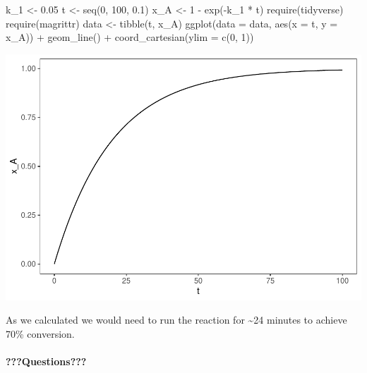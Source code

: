 \documentclass[
]{article}
\newenvironment{Shaded}{\begin{snugshade}}{\end{snugshade}}
\newcommand{\AttributeTok}[1]{\textcolor[rgb]{0.77,0.63,0.00}{#1}}
\newcommand{\DecValTok}[1]{\textcolor[rgb]{0.00,0.00,0.81}{#1}}
\newcommand{\FloatTok}[1]{\textcolor[rgb]{0.00,0.00,0.81}{#1}}
\newcommand{\FunctionTok}[1]{\textcolor[rgb]{0.00,0.00,0.00}{#1}}
\newcommand{\NormalTok}[1]{#1}
\newcommand{\OtherTok}[1]{\textcolor[rgb]{0.56,0.35,0.01}{#1}}
\newcommand{\SpecialCharTok}[1]{\textcolor[rgb]{0.00,0.00,0.00}{#1}}
\begin{document}
\begin{Shaded}
\begin{Highlighting}[]
\NormalTok{k\_1 }\OtherTok{\textless{}{-}} \FloatTok{0.05}
\NormalTok{t }\OtherTok{\textless{}{-}} \FunctionTok{seq}\NormalTok{(}\DecValTok{0}\NormalTok{, }\DecValTok{100}\NormalTok{, }\FloatTok{0.1}\NormalTok{)}
\NormalTok{x\_A }\OtherTok{\textless{}{-}} \DecValTok{1} \SpecialCharTok{{-}} \FunctionTok{exp}\NormalTok{(}\SpecialCharTok{{-}}\NormalTok{k\_1 }\SpecialCharTok{*}\NormalTok{ t)}
\FunctionTok{require}\NormalTok{(tidyverse)}
\FunctionTok{require}\NormalTok{(magrittr)}
\NormalTok{data }\OtherTok{\textless{}{-}} \FunctionTok{tibble}\NormalTok{(t, x\_A)}
\FunctionTok{ggplot}\NormalTok{(}\AttributeTok{data =}\NormalTok{ data, }\FunctionTok{aes}\NormalTok{(}\AttributeTok{x =}\NormalTok{ t, }\AttributeTok{y =}\NormalTok{ x\_A)) }\SpecialCharTok{+} \FunctionTok{geom\_line}\NormalTok{() }\SpecialCharTok{+} 
    \FunctionTok{coord\_cartesian}\NormalTok{(}\AttributeTok{ylim =} \FunctionTok{c}\NormalTok{(}\DecValTok{0}\NormalTok{, }\DecValTok{1}\NormalTok{))}
\end{Highlighting}
\end{Shaded}

\includegraphics{Bioprocess_Engineering_files/figure-latex/unnamed-chunk-8-1.pdf}

As we calculated we would need to run the reaction for \textasciitilde24 minutes to achieve 70\% conversion.

\hypertarget{questions-3}{%
\paragraph{???Questions???}\label{questions-3}}
\end{document}
